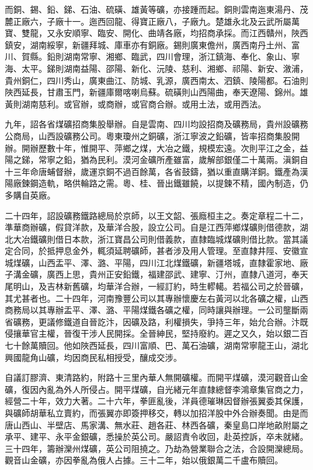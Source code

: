 \begin{pinyinscope}
而銅、錫、鉛、銻、石油、硫磺、雄黃等礦，亦接踵而起。銅則雲南迤東湯丹、茂麓正廠六，子廠十一。迤西回龍、得寶正廠八，子廠九。楚雄永北及云武所屬萬寶、雙龍，又永安順寧、臨安、開化、曲靖各廠，均招商承採。而江西贛州，陜西鎮安，湖南綏寧，新疆拜城、庫車亦有銅廠。錫則廣東儋州，廣西南丹土州、富川、賀縣。鉛則湖南常寧、湘鄉、臨武，四川會理，浙江鎮海、奉化、象山、寧海、太平。銻則湖南益陽、邵陽、新化、沅陵、慈利、湘鄉、祁陽、新安、漵浦，貴州銅仁，四川秀山，廣東曲江、防城、乳源，廣西南太、泗鎮、陵陽都。石油則陜西延長，甘肅玉門，新疆庫爾喀喇烏蘇。硫磺則山西陽曲，奉天遼陽、錦州。雄黃則湖南慈利。或官辦，或商辦，或官商合辦。或用土法，或用西法。

九年，詔各省煤礦招商集股舉辦。自是雲南、四川均設招商及礦務局，貴州設礦務公商局，山西設礦務公司。粵東瓊州之銅礦，浙江寧波之鉛礦，皆率招商集股開辦。開辦歷數十年，惟開平、萍鄉之煤，大冶之鐵，規模宏遠。次則平江之金，益陽之銻，常寧之鉛，猶為民利。漠河金礦所產雖富，歲解部銀僅二十萬兩。滇銅自十三年命唐蜅督辦，歲運京銅不過百餘萬，各省鼓鑄，猶以重直購洋銅。鐵產為漢陽廠鍊鋼造軌，略供輪路之需。粵、桂、晉出鐵雖饒，以提鍊不精，國內制造，仍多購自英廠。

二十四年，詔設礦務鐵路總局於京師，以王文韶、張廕桓主之。奏定章程二十二，準華商辦礦，假貸洋款，及華洋合股，設立公司。自是江西萍鄉煤礦則借德款，湖北大冶鐵礦則借日本款，浙江寶昌公司則借義款，直隸臨城煤礦則借比款。當其議定合同，於抵押息金外，輒須延聘礦師，甚者涉及用人管理。至直隸井陘、安徽宣城煤礦，山西盂平、澤、潞、平陽，四川江北煤鐵礦，新疆塔城，直隸霍家地、廠子溝金礦，廣西上思，貴州正安鉛鐵，福建邵武、建寧、汀州，直隸八道河，奉天尾明山，及吉林新舊礦，均華洋合辦，一經訂約，時生轇轕。若福公司之於晉礦，其尤甚者也。二十四年，河南豫豐公司以其專辦懷慶左右黃河以北各礦之權，山西商務局以其專辦盂平、澤、潞、平陽煤鐵各礦之權，同時讓與辦理。一公司壟斷兩省礦務，更議修鐵道自晉訖汴，因礦及路，利權損失，爭持三年，始允合辦。汴既侵攘華官主權，晉復干涉人民開採。全晉紳民，堅持廢約。遲之又久，始以銀二百七十餘萬贖回。他如陜西延長，四川富順、巴、萬石油礦，湖南常寧龍王山，湖北興國龍角山礦，均因商民私相授受，釀成交涉。

自議訂膠濟、東清路約，附路十三里內華人無開礦權。而開平煤礦，漠河觀音山金礦，復因內亂為外人所侵占。開平煤礦，自光緒元年直隸總督李鴻章集官商之力，經營二十年，效力大著。二十六年，拳匪亂後，洋員德璀琳因督辦張翼委其保護，與礦師胡華私立賣約，而張翼亦即簽押移交，轉以加招洋股中外合辦奏聞。由是而唐山西山、半壁店、馬家溝、無水莊、趙各莊、林西各礦，秦皇島口岸地畝附屬之承平、建平、永平金銀礦，悉操於英公司。嚴詔責令收回，赴英控訴，卒未就緒。三十四年，籌辦灤州煤礦，英公司阻撓之。乃劫為營業聯合之法，合設開灤總局。觀音山金礦，亦因拳亂為俄人占據。三十二年，始以俄銀萬二千盧布贖回。


\end{pinyinscope}
